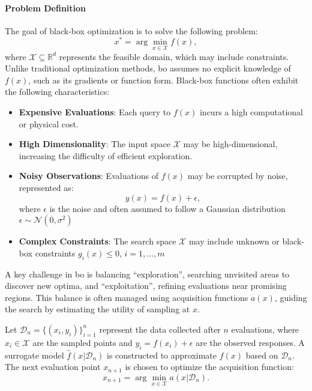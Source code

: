 \paragraph{Problem Definition}

The goal of black-box optimization is to solve the following problem:  
\[
x^* = \arg\min_{x \in \mathcal{X}} f(x),
\]  
where $\mathcal{X} \subseteq \mathbb{R}^d$ represents the feasible domain, which may include constraints. Unlike traditional optimization methods, \ac{bo} assumes no explicit knowledge of \( f(x) \), such as its gradients or function form.  Black-box functions often exhibit the following characteristics:  
\begin{itemize}
    \item \textbf{Expensive Evaluations}: Each query to \( f(x) \) incurs a high computational or physical cost. 
    \item \textbf{High Dimensionality}: The input space \( \mathcal{X} \) may be high-dimensional, increasing the difficulty of efficient exploration. 
    \item \textbf{Noisy Observations}: Evaluations of \( f(x) \) may be corrupted by noise, represented as:  
   \[
   y(x) = f(x) + \epsilon,
   \]  
   where $\epsilon$ is the noise and often assumed to follow a Gaussian distribution $\epsilon \sim \mathcal{N}(0, \sigma^2)$
\item \textbf{Complex Constraints}: The search space \( \mathcal{X} \) may include unknown or black-box constraints \( g_i(x) \leq 0 \), \( i = 1, \dots, m \)
\end{itemize}


A key challenge in \ac{bo} is balancing ``exploration'', searching unvisited areas to discover new optima, and ``exploitation'', refining evaluations near promising regions. This balance is often managed using acquisition functions \( a(x) \), guiding the search by estimating the utility of sampling at \( x \).  


Let \( \mathcal{D}_n = \{(x_i, y_i)\}_{i=1}^n \) represent the data collected after \( n \) evaluations, where \( x_i \in \mathcal{X} \) are the sampled points and \( y_i = f(x_i) + \epsilon \) are the observed responses. A surrogate model \( \hat{f}(x | \mathcal{D}_n) \) is constructed to approximate \( f(x) \) based on \( \mathcal{D}_n \). The next evaluation point \( x_{n+1} \) is chosen to optimize the acquisition function:  
\[
x_{n+1} = \arg\min_{x \in \mathcal{X}} a(x | \mathcal{D}_n).
\]  



